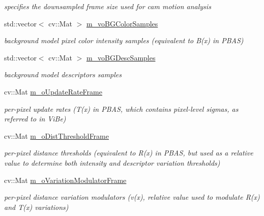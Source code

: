 \begin{DoxyCompactItemize}
\begin{DoxyCompactList}\small\item\em specifies the downsampled frame size used for cam motion analysis \end{DoxyCompactList}\item 
std\+::vector$<$ cv\+::\+Mat $>$ \mbox{\hyperlink{class_background_subtractor_su_b_s_e_n_s_e_a9d4d4bb930b34745536b9862683bb539}{m\+\_\+vo\+B\+G\+Color\+Samples}}
\begin{DoxyCompactList}\small\item\em background model pixel color intensity samples (equivalent to \textquotesingle{}B(x)\textquotesingle{} in P\+B\+AS) \end{DoxyCompactList}\item 
std\+::vector$<$ cv\+::\+Mat $>$ \mbox{\hyperlink{class_background_subtractor_su_b_s_e_n_s_e_a422cc2f2a25c07efca02087bd6fe3d6d}{m\+\_\+vo\+B\+G\+Desc\+Samples}}
\begin{DoxyCompactList}\small\item\em background model descriptors samples \end{DoxyCompactList}\item 
cv\+::\+Mat \mbox{\hyperlink{class_background_subtractor_su_b_s_e_n_s_e_a90cb2cc5cbe3f2f0b01e06f514c8b569}{m\+\_\+o\+Update\+Rate\+Frame}}
\begin{DoxyCompactList}\small\item\em per-\/pixel update rates (\textquotesingle{}T(x)\textquotesingle{} in P\+B\+AS, which contains pixel-\/level \textquotesingle{}sigmas\textquotesingle{}, as referred to in Vi\+Be) \end{DoxyCompactList}\item 
cv\+::\+Mat \mbox{\hyperlink{class_background_subtractor_su_b_s_e_n_s_e_a491a1e2b81dee87a721a421719bf2836}{m\+\_\+o\+Dist\+Threshold\+Frame}}
\begin{DoxyCompactList}\small\item\em per-\/pixel distance thresholds (equivalent to \textquotesingle{}R(x)\textquotesingle{} in P\+B\+AS, but used as a relative value to determine both intensity and descriptor variation thresholds) \end{DoxyCompactList}\item 
cv\+::\+Mat \mbox{\hyperlink{class_background_subtractor_su_b_s_e_n_s_e_a47d9cf067ac639d95fcb810c894bb770}{m\+\_\+o\+Variation\+Modulator\+Frame}}
\begin{DoxyCompactList}\small\item\em per-\/pixel distance variation modulators (\textquotesingle{}v(x)\textquotesingle{}, relative value used to modulate \textquotesingle{}R(x)\textquotesingle{} and \textquotesingle{}T(x)\textquotesingle{} variations) \end{DoxyCompactList}\item 

\end{DoxyCompactItemize}
